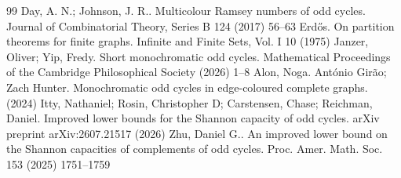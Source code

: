 \documentclass[10pt,a4paper]{amsart}
\numberwithin{theorem}{section}
\begin{document}
\begin{thebibliography}{99}
 Day, A. N.; Johnson, J. R.. Multicolour {Ramsey} numbers of odd cycles. Journal of Combinatorial Theory, Series B 124 (2017) 56--63
 Erd{\H{o}}s. On partition theorems for finite graphs. Infinite and Finite Sets, Vol. I 10 (1975)
 Janzer, Oliver; Yip, Fredy. Short monochromatic odd cycles. Mathematical Proceedings of the Cambridge Philosophical Society (2026) 1--8
 Alon, Noga.
 António Girão; Zach Hunter. Monochromatic odd cycles in edge-coloured complete graphs. (2024)
 Itty, Nathaniel; Rosin, Christopher D; Carstensen, Chase; Reichman, Daniel. Improved lower bounds for the Shannon capacity of odd cycles. arXiv preprint arXiv:2607.21517 (2026)
 Zhu, Daniel G.. An improved lower bound on the {S}hannon capacities of complements of odd cycles. Proc. Amer. Math. Soc. 153 (2025) 1751--1759
\end{thebibliography}
\end{document}
